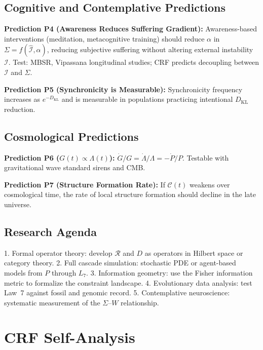\documentclass[12pt, a4paper]{article}
\begin{document}
\subsection{Cognitive and Contemplative Predictions}

\textbf{Prediction P4 (Awareness Reduces Suffering Gradient):} Awareness-based interventions
(meditation, metacognitive training) should reduce $\alpha$ in $\Sigma = f(\hat{\mathcal{I}}, \alpha)$,
reducing subjective suffering without altering external instability $\mathcal{I}$. Test:
MBSR, Vipassana longitudinal studies; CRF predicts decoupling between $\mathcal{I}$ and $\Sigma$.

\textbf{Prediction P5 (Synchronicity is Measurable):} Synchronicity frequency increases as
$e^{-D_{\mathrm{KL}}}$ and is measurable in populations practicing intentional $D_{\mathrm{KL}}$
reduction.

\subsection{Cosmological Predictions}

\textbf{Prediction P6 ($G(t) \propto \Lambda(t)$):}
$\dot{G}/G = \dot{\Lambda}/\Lambda = -\dot{P}/P$.
Testable with gravitational wave standard sirens and CMB.

\textbf{Prediction P7 (Structure Formation Rate):} If $\mathcal{C}(t)$ weakens over
cosmological time, the rate of local structure formation should decline in the late universe.

\subsection{Research Agenda}

1. Formal operator theory: develop $\mathcal{R}$ and $D$ as operators in Hilbert space or
category theory.
2. Full cascade simulation: stochastic PDE or agent-based models from $P$ through $L_7$.
3. Information geometry: use the Fisher information metric to formalize the constraint landscape.
4. Evolutionary data analysis: test Law~7 against fossil and genomic record.
5. Contemplative neuroscience: systematic measurement of the $\Sigma$--$W$ relationship.

\section{CRF Self-Analysis}
\end{document}
